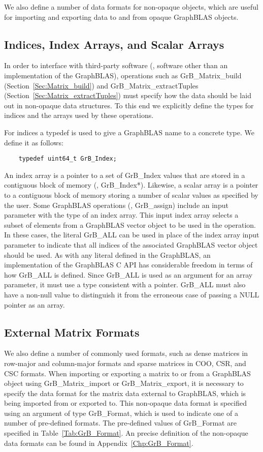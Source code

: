 We also define a number of data formats for non-opaque objects, which are useful
for importing and exporting data to and from opaque GraphBLAS objects.

\subsection{Indices, Index Arrays, and Scalar Arrays}

In order to interface with third-party software (\ie, software other than
an implementation of the GraphBLAS), operations 
such as {\sf GrB\_Matrix\_build} (Section~\ref{Sec:Matrix_build}) and
{\sf GrB\_Matrix\_extractTuples} (Section~\ref{Sec:Matrix_extractTuples}) must specify
how the data should be laid out in  non-opaque data structures.  To 
this end we explicitly define the types for indices and the arrays 
used by these operations.

For indices a {\sf typedef} is used to give a GraphBLAS name to a concrete type. We define it as follows:

\begin{verbatim}
    typedef uint64_t GrB_Index;
\end{verbatim}

An index array is a pointer to a set of {\sf GrB\_Index} values that are 
stored in a contiguous block of memory (\ie, {\sf GrB\_Index*}).
Likewise, a scalar array is a pointer to a contiguous block of memory 
storing a number of scalar values as specified by the user.
Some GraphBLAS operations (\eg, {\sf GrB\_assign})  include an input parameter with the type of an index array. 
This input index array selects a subset of elements from a GraphBLAS vector object to be used in the operation.
In these cases, the literal {\sf GrB\_ALL} 
can be used in place of the index array input parameter to indicate that all indices 
of the associated GraphBLAS vector object should be used.
As with any literal defined in the GraphBLAS, an implementation of the GraphBLAS C API has considerable 
freedom in terms of how {\sf GrB\_ALL} is defined.  Since {\sf GrB\_ALL} is used as an argument for an array 
parameter, it must use a type consistent with a pointer. {\sf GrB\_ALL} must also have a non-null
value to distinguish it from the erroneous case of passing a {\sf NULL} pointer as an array.

\subsection{External Matrix Formats}
We also define a number of commonly used formats, such as dense matrices in
row-major and column-major formats and sparse matrices in COO, CSR, and CSC
formats.  When
importing or exporting a matrix to or from a GraphBLAS object using
{\sf GrB\_Matrix\_import} or {\sf GrB\_Matrix\_export}, it is necessary to
specify the data format for the matrix data external to GraphBLAS, which is
being imported from or exported to.  This non-opaque data format is specified
using an argument of type {\sf GrB\_Format}, which is used to indicate one of a
number of pre-defined formats.  The pre-defined values of {\sf GrB\_Format} are
specified in Table~\ref{Tab:GrB_Format}.  An precise definition of the non-opaque
data formats can be found in Appendix~\ref{Chp:GrB_Format}.

